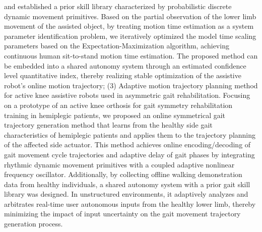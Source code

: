 \begin{abstract*}
and established a prior skill library characterized by probabilistic discrete dynamic movement primitives. Based on the partial observation of the lower limb movement of the assisted object, by treating motion time estimation as a system parameter identification problem, we iteratively optimized the model time scaling parameters based on the Expectation-Maximization algorithm, achieving continuous human sit-to-stand motion time estimation. The proposed method can be embedded into a shared autonomy system through an estimated confidence level quantitative index, thereby realizing stable optimization of the assistive robot's online motion trajectory; (3) Adaptive motion trajectory planning method for active knee assistive robots used in asymmetric gait rehabilitation. Focusing on a prototype of an active knee orthosis for gait symmetry rehabilitation training in hemiplegic patients, we proposed an online symmetrical gait trajectory generation method that learns from the healthy side gait characteristics of hemiplegic patients and applies them to the trajectory planning of the affected side actuator. This method achieves online encoding/decoding of gait movement cycle trajectories and adaptive delay of gait phases by integrating rhythmic dynamic movement primitives with a coupled adaptive nonlinear frequency oscillator. Additionally, by collecting offline walking demonstration data from healthy individuals, a shared autonomy system with a prior gait skill library was designed. In unstructured environments, it adaptively analyzes and arbitrates real-time user autonomous inputs from the healthy lower limb, thereby minimizing the impact of input uncertainty on the gait movement trajectory generation process.
\end{abstract*}
